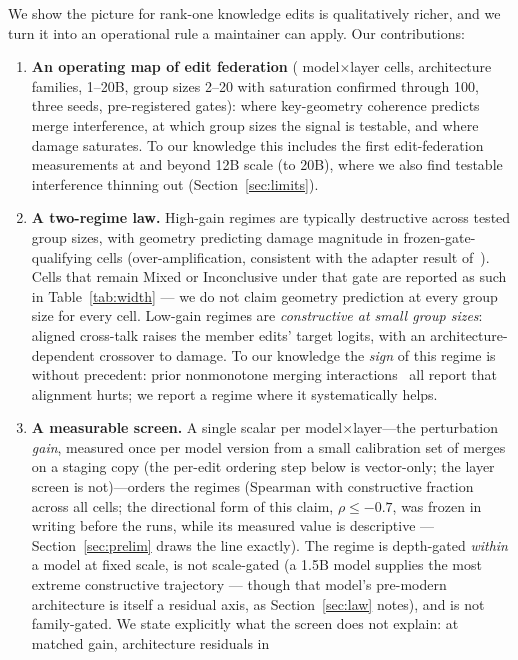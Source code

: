 \documentclass[preprint,12pt]{elsarticle}
\theoremstyle{definition}
\begin{document}
We show the picture for rank-one knowledge edits is qualitatively richer, and we turn it
into an operational rule a maintainer can apply. Our contributions:
\begin{enumerate}
\item \textbf{An operating map of edit federation} (\nCells{} model$\times$layer cells,
\nFamilies{} architecture families, 1--20B, group sizes 2--20 with saturation confirmed
through 100, three seeds, pre-registered gates): where key-geometry coherence predicts merge interference, at which group sizes the
signal is testable, and where damage saturates. To our knowledge this includes the first
edit-federation measurements at and beyond 12B scale (to 20B), where we also find
testable interference thinning out (Section~\ref{sec:limits}).
\item \textbf{A two-regime law.} High-gain regimes are typically destructive across tested
group sizes, with geometry predicting damage magnitude in frozen-gate-qualifying cells
(over-amplification, consistent with the adapter result of~\cite{mergeprobe2026}).
Cells that remain Mixed or Inconclusive under that gate are reported as such in
Table~\ref{tab:width} --- we do not claim geometry prediction at every group size for every
cell. Low-gain regimes are \emph{constructive at small group sizes}:
aligned cross-talk raises the member edits' target logits, with an architecture-dependent
crossover to damage. To our knowledge the \emph{sign} of this regime is without precedent:
prior nonmonotone merging interactions~\cite{forkmerge2023,mergeprobe2026} all report that
alignment hurts; we report a regime where it systematically helps.
\item \textbf{A measurable screen.} A single scalar per model$\times$layer---the
perturbation \emph{gain}, measured once per model version from a small calibration set
of merges on a staging copy (the per-edit ordering step below is vector-only; the layer
screen is not)---orders
the regimes (Spearman \ordSpearman{} with constructive fraction across all cells; the
directional form of this claim, $\rho\leq-0.7$, was frozen in writing before the runs,
while its measured value is descriptive --- Section~\ref{sec:prelim} draws the line
exactly). The
regime is depth-gated \emph{within} a model at fixed scale, is not scale-gated (a 1.5B model
supplies the most extreme constructive trajectory --- though that model's pre-modern
architecture is itself a residual axis, as Section~\ref{sec:law} notes), and is not
family-gated. We state explicitly
what the screen does not explain: at matched gain, architecture residuals in

\end{enumerate}
\end{document}
